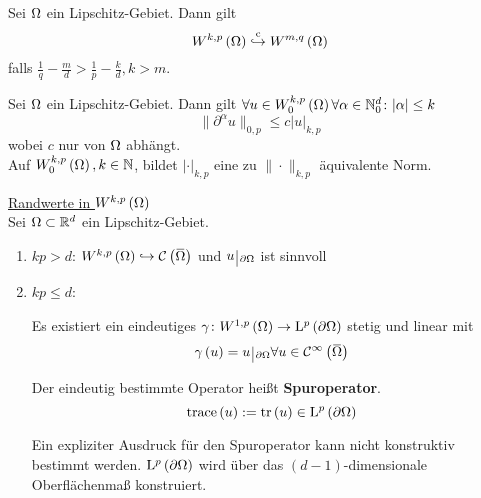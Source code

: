 \begin{lemma}
	Sei $\Omega$ ein Lipschitz-Gebiet. Dann gilt
	\begin{equation*}
		W^{k,p}\left(\W\right)\cembed W^{m,q}\left(\W\right)
	\end{equation*}
	falls $\frac{1}{q}-\frac{m}{d} > \frac{1}{p}-\frac{k}{d}, k>m$.
\end{lemma}

\begin{lemma}
	Sei $\Omega$ ein Lipschitz-Gebiet. Dann gilt $\forall u\in W^{k,p}_{0}\left(\Omega\right)\forall\alpha\in\mathbb{N}_{0}^{d}\colon |\alpha|\leq k$
	\begin{equation*}
		\|\partial^{\alpha}u\|_{0,p}\leq c|u|_{k,p}
	\end{equation*}
	wobei $c$ nur von $\Omega$ abhängt.\\
	Auf $W^{k,p}_{0}\left(\Omega\right),k\in\mathbb{N}$, bildet $|\cdot|_{k,p}$ eine zu $\|\cdot\|_{k,p}$ äquivalente Norm.
\end{lemma}

\underline{Randwerte in $W^{k,p}\left(\Omega\right)$}\\
Sei $\Omega\subset\mathbb{R}^{d}$ ein Lipschitz-Gebiet.
\begin{enumerate}
	\item $kp>d$: $W^{k,p}\left(\W\right)\hookrightarrow\C\left(\overbar{\W}\right)$ und $u\einschraenkung_{\partial\W}$ ist sinnvoll
	\item $kp\leq d$:
		\begin{lemma}[Spursatz]
			Es existiert ein eindeutiges $\gamma\colon W^{1,p}\left(\Omega\right)\to\mathrm{L}^{p}\left(\partial \Omega\right)$ stetig und linear mit
			\begin{equation*}
				\gamma\left(u\right) = u\einschraenkung_{\partial\W}\forall u\in\C^{\infty}\left(\overbar{\W}\right)
			\end{equation*}
		\end{lemma}
		\begin{definition}
			Der eindeutig bestimmte Operator heißt \textbf{Spuroperator}.
			\begin{equation*}
				\operatorname{trace}\left(u\right):=\operatorname{tr}\left(u\right)\in\mathrm{L}^{p}\left(\partial\Omega\right)
			\end{equation*}
		\end{definition}
		Ein expliziter Ausdruck für den Spuroperator kann nicht konstruktiv bestimmt werden. $\mathrm{L}^{p}\left(\partial\Omega\right)$ wird über das $\left(d-1\right)$-dimensionale Oberflächenmaß konstruiert.
\end{enumerate}

